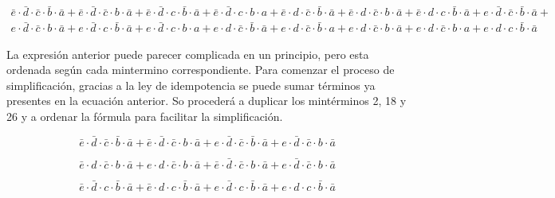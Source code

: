 \begin{multline}
\bar{e} \cdot \bar{d} \cdot \bar{c} \cdot \bar{b} \cdot \bar{a} + 
\bar{e} \cdot \bar{d} \cdot \bar{c} \cdot b \cdot \bar{a} +
\bar{e} 	\cdot \bar{d} \cdot c \cdot \bar{b} \cdot \bar{a} +
\bar{e} \cdot \bar{d} \cdot c \cdot b \cdot a + 
\bar{e} \cdot d \cdot \bar{c} \cdot \bar{b} \cdot \bar{a} + 
\bar{e} \cdot d \cdot \bar{c} \cdot b \cdot \bar{a} + 
\bar{e} \cdot d \cdot c \cdot \bar{b} \cdot \bar{a} + 
e \cdot \bar{d} \cdot \bar{c} \cdot \bar{b} \cdot \bar{a} + \\
e \cdot \bar{d} \cdot \bar{c} \cdot b \cdot \bar{a} + 
e \cdot \bar{d} \cdot c \cdot \bar{b} \cdot \bar{a} + 		
e \cdot \bar{d} \cdot c \cdot b \cdot a + 
e \cdot d \cdot \bar{c} \cdot \bar{b} \cdot \bar{a} + 
e \cdot d \cdot \bar{c} \cdot \bar{b} \cdot a + 
e \cdot d \cdot \bar{c} \cdot b \cdot \bar{a} + 
e \cdot d \cdot \bar{c} \cdot b \cdot a +
e \cdot d \cdot c \cdot \bar{b} \cdot \bar{a} 
\end{multline}

La expresión anterior puede parecer complicada en un principio, pero esta ordenada según cada mintermino correspondiente. Para comenzar el proceso de simplificación, gracias a la ley de idempotencia se puede sumar términos ya presentes en la ecuación anterior. So procederá a duplicar los mintérminos 2, 18 y 26 y a ordenar la fórmula para facilitar la simplificación. 

\begin{equation}
\bar{e} \cdot \bar{d} \cdot \bar{c} \cdot \bar{b} \cdot \bar{a} +  %
\bar{e} \cdot \bar{d} \cdot \bar{c} \cdot b \cdot \bar{a} +        %
e \cdot \bar{d} \cdot \bar{c} \cdot \bar{b} \cdot \bar{a} +    	  %
e \cdot \bar{d} \cdot \bar{c} \cdot b \cdot \bar{a}  	          %
\end{equation}

\begin{equation}
\bar{e} \cdot d \cdot \bar{c} \cdot b \cdot \bar{a} + 		      %
e \cdot d \cdot \bar{c} \cdot b \cdot \bar{a} + 	                  %
\bar{e} \cdot \bar{d} \cdot \bar{c} \cdot b \cdot \bar{a} +        %
e \cdot \bar{d} \cdot \bar{c} \cdot b \cdot \bar{a}  	          %
\end{equation}

\begin{equation}
\bar{e} 	\cdot \bar{d} \cdot c \cdot \bar{b} \cdot \bar{a} +	      %
\bar{e} \cdot d \cdot c \cdot \bar{b} \cdot \bar{a} + 			  %
e \cdot \bar{d} \cdot c \cdot \bar{b} \cdot \bar{a} + 		      %
e \cdot d \cdot c \cdot \bar{b} \cdot \bar{a}                      %
\end{equation}

